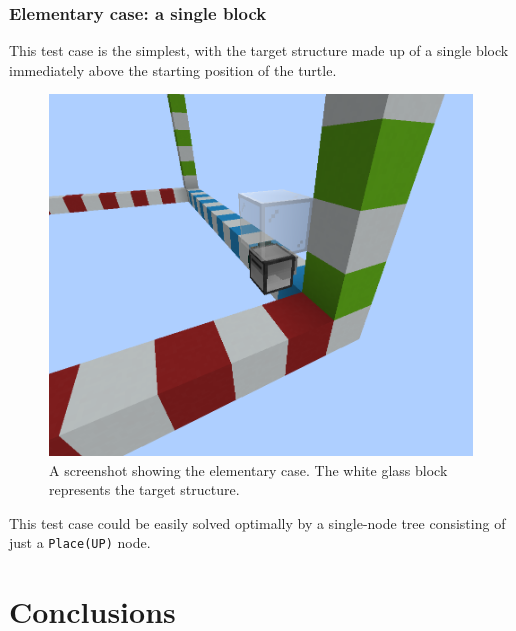 \documentclass{report}
\begin{document}
\subsection{Elementary case: a single block}
This test case is the simplest, with the target structure made up of a single block immediately above the starting position of the turtle.

\begin{figure}[H]
    \centering
    \includegraphics[scale=0.3]{minecraft2}
    \caption{A screenshot showing the elementary case. The white glass block represents the target structure.}
\end{figure}

This test case could be easily solved optimally by a single-node tree consisting of just a \verb|Place(UP)| node.

\chapter{Conclusions}



\end{document}
